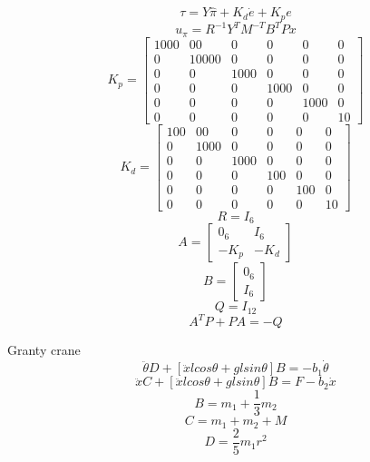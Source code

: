 \documentclass[a4paper]{article}
\begin{document}
\begin{equation}
\tau = Y \hat{\pi} + K_d\dot{e} + K_p e
\end{equation}
\begin{equation}
u_{\pi} = R^{-1} Y^T M^{-T} B^T P x
\end{equation}
\begin{equation}
K_p = 
\begin{bmatrix}
1000 & 00 & 0	& 0 & 0 & 0 \\
0 & 10000 & 0 & 0 & 0 & 0 \\
0 & 0 & 1000 & 0 & 0 & 0 \\
0 & 0 & 0 & 1000 & 0 & 0 \\
0 & 0 & 0 & 0 & 1000 & 0 \\
0 & 0 & 0 & 0 & 0 & 10
\end{bmatrix}
\end{equation}
\begin{equation}
K_d = 
\begin{bmatrix}
100 & 00 & 0	& 0 & 0 & 0 \\
0 & 1000 & 0 & 0 & 0 & 0 \\
0 & 0 & 1000 & 0 & 0 & 0 \\
0 & 0 & 0 & 100& 0 & 0 \\
0 & 0 & 0 & 0 & 100 & 0 \\
0 & 0 & 0 & 0 & 0 & 10
\end{bmatrix}
\end{equation}
\begin{equation}
R = I_{6}
\end{equation}
\begin{equation}
A = 
\begin{bmatrix}
0_{6} & I_{6} \\
-K_p & -K_d 
\end{bmatrix}
\end{equation}
\begin{equation}
B = 
\begin{bmatrix}
0_{6} \\
I_{6}
\end{bmatrix}
\end{equation}
\begin{equation}
Q = I_{12}
\end{equation}
\begin{equation}
A^T P + P A = -Q
\end{equation}

Granty crane
\begin{equation}
\ddot{\theta}D  + [\ddot{x}lcos\theta + glsin\theta] B = -b_1 \dot{\theta}
\end{equation}
\begin{equation}
\ddot{x}C  + [\ddot{x}lcos\theta + glsin\theta] B = F - b_2 \dot{x}
\end{equation}
\begin{equation}
B = m_1 + \frac{1}{3}m_2
\end{equation}
\begin{equation}
C = m_1 + m_2 + M
\end{equation}
\begin{equation}
D = \frac{2}{5}m_1r^2
\end{equation}
\end{document}
